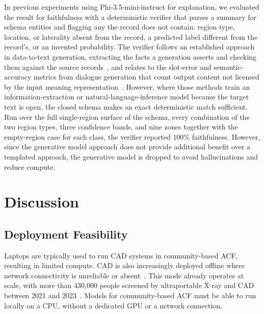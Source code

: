 \documentclass[conference, letterpaper]{IEEEtran}
\begin{document}
In previous experiments using Phi-3.5-mini-instruct for explanation, we evaluated the result for faithfulness with a deterministic verifier that parses a summary for schema entities and flagging any the record does not contain: region type, location, or laterality absent from the record, a predicted label different from the record's, or an invented probability. The verifier follows an established approach in data-to-text generation, extracting the facts a generation asserts and checking them against the source records~\cite{wiseman2017challenges}, and relates to the slot-error and semantic-accuracy metrics from dialogue generation that count output content not licensed by the input meaning representation~\cite{wen2015sclstm, dusek2020semantic}. However, where those methods train an information-extraction or natural-language-inference model because the target text is open, the closed schema makes an exact deterministic match sufficient. Run over the full single-region surface of the schema, every combination of the two region types, three confidence bands, and nine zones together with the empty-region case for each class, the verifier reported $100\%$ faithfulness. However, since the generative model approach does not provide additional benefit over a templated approach, the generative model is dropped to avoid hallucinations and reduce compute.

\section{Discussion}

\subsection{Deployment Feasibility}

Laptops are typically used to run CAD systems in community-based ACF, resulting in limited compute. CAD is also increasingly deployed offline where network connectivity is unreliable or absent~\cite{stoptb_ultraportable, stoptb_cad_guide}. This mode already operates at scale, with more than 430,000 people screened by ultraportable X-ray and CAD between 2021 and 2023~\cite{min2025scanned}. Models for community-based ACF must be able to run locally on a CPU, without a dedicated GPU or a network connection.
\end{document}
